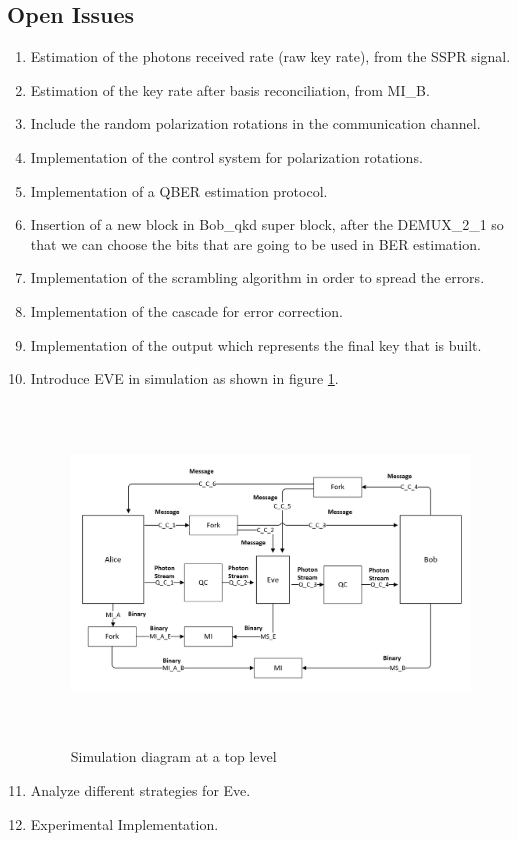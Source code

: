 \begin{refsection}
\subsection{Open Issues}
\begin{enumerate}
    \item Estimation of the photons received rate (raw key rate), from the \textrm{SSPR} signal.
    \item Estimation of the key rate after basis reconciliation, from \textrm{MI\_B}.
    \item Include the random polarization rotations in the communication channel.
    \item Implementation of the control system for polarization rotations.
    \item Implementation of a \textrm{QBER} estimation protocol.
    \item Insertion of a new block in \textrm{Bob\_qkd} super block, after the DEMUX\_2\_1 so that we can choose the bits that are going to be used in \textrm{BER} estimation.
    \item Implementation of the scrambling algorithm in order to spread the errors.
    \item Implementation of the cascade for error correction.
    \item Implementation of the output which represents the final key that is built.
    \item Introduce EVE in simulation as shown in figure \ref{toplevelsimulation2}.
        \begin{figure}[H]
        	\centering
        	\includegraphics[width=1.0\textwidth, height=9cm]{./sdf/bb84_with_discrete_variables/figures/toplevel_simulation.png}
        	\caption{Simulation diagram at a top level}\label{toplevelsimulation2}
        \end{figure}
    \item Analyze different strategies for Eve.
    \item Experimental Implementation.
\end{enumerate}




\end{refsection}
